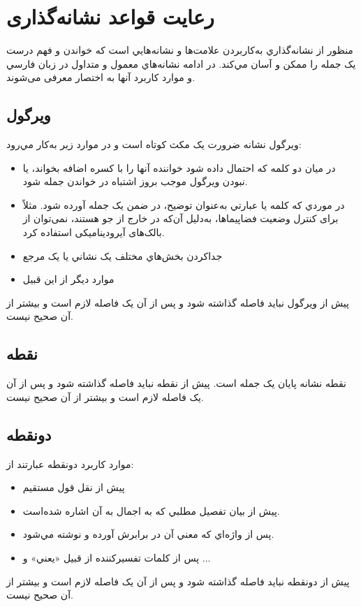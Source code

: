 \subsection{}
\section{رعایت قواعد نشانه‌گذاری}
منظور از نشانه‌گذاري به‌کار‌بردن علامت‌ها و نشانه‌هايي است که خواندن و فهم درست یک جمله را ممکن و آسان مي‌کند. در ادامه نشانه‌هاي معمول و متداول در زبان فارسي و موارد کاربرد آنها به اختصار معرفی می‌شوند.

\subsection{ويرگول}
ويرگول نشانه ضرورت یک مکث کوتاه است و در موارد زير به‌کار مي‌رود:
\begin{itemize}
\item
در ميان دو کلمه که احتمال داده شود خواننده آنها را با کسره اضافه بخواند، يا نبودن ويرگول موجب بروز اشتباه در خواندن جمله شود.
\item
در موردي که کلمه يا عبارتي به‌‌‌‌عنوان توضيح، در ضمن یک جمله آورده شود. مثلاً برای کنترل وضعیت فضاپیماها، به‌دلیل آن‌که در خارج از جو هستند، نمی‌توان از بالک‌های آیرودینامیکی استفاده کرد.
\item
جدا‌کردن بخش‌هاي مختلف يک نشاني يا یک مرجع
\item
موارد دیگر از این قبیل
\end{itemize}
پیش از ويرگول نبايد فاصله گذاشته شود و پس از آن يک فاصله لازم است و بيشتر از آن صحیح نیست.
\subsection{نقطه}
نقطه نشانه پایان یک جمله است. پیش از نقطه نبايد فاصله گذاشته شود و پس از آن يک فاصله لازم است و بيشتر از آن صحیح نیست.
\subsection{دونقطه}
موارد کاربرد دونقطه عبارتند از:
\begin{itemize}
\item
پيش از نقل قول مستقيم
\item
پيش از بيان تفصيل مطلبي که به اجمال به آن اشاره شده‌است.
\item
پس از واژه‌اي که معني آن در برابرش آورده و نوشته مي‌شود.
\item
پس از کلمات تفسير‌کننده از قبيل «يعني» و ...
\end{itemize}
پیش از دونقطه نبايد فاصله گذاشته شود و پس از آن يک فاصله لازم است و بيشتر از آن صحیح نیست.
